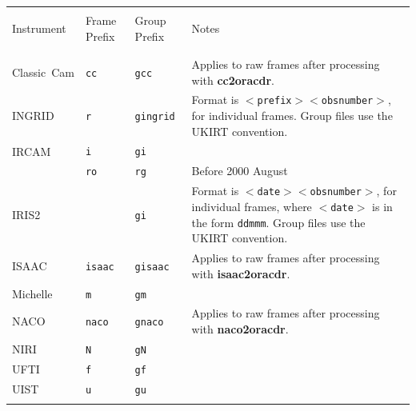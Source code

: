 \documentclass[twoside,11pt]{article}
\renewcommand{\_}{\texttt{\symbol{95}}}
\begin{document}
\begin{center}
\begin{tabular}{lllp{71mm}}
\hline
           &              &               & \\
Instrument~& Frame Prefix & Group Prefix  & Notes \\ 
           &              &               & \\ \hline
           &              &               & \\ \medskip
Classic~Cam& {\tt{cc}}    & {\tt{gcc}}    & Applies to raw frames after
                                            processing with {\bf{cc2oracdr}}. \\
INGRID     & {\tt{r}}     & {\tt{gingrid}}& Format is {\tt$<$prefix$><$obs\_number$>$},
                                            for individual frames.  Group files
                                            use the UKIRT convention. \\
IRCAM      & {\tt{i}}     & {\tt{gi}}     & \\ \medskip
           & {\tt{ro}}    & {\tt{rg}}     & Before 2000 August \\ \medskip
IRIS2      &              & {\tt{gi}}     & Format is {\tt$<$date$><$obs\_number$>$}, 
                                            for individual frames, where {\tt$<$date$>$}
                                            is in the form {\tt{ddmmm}}.   Group files
                                            use the UKIRT convention. \\ \medskip
ISAAC      & {\tt{isaac}} & {\tt{gisaac}} & Applies to raw frames after
                                            processing with {\bf{isaac2oracdr}}. \\ \medskip
Michelle   & {\tt{m}}     & {\tt{gm}}     & \\ \medskip
NACO       & {\tt{naco}}  & {\tt{gnaco}}  & Applies to raw frames after
                                            processing with {\bf{naco2oracdr}}. \\ \medskip
NIRI       & {\tt{N}}     & {\tt{gN}}     & \\ \medskip
UFTI       & {\tt{f}}     & {\tt{gf}}     & \\ \medskip
UIST       & {\tt{u}}     & {\tt{gu}}     & \\
           &              &               & \\ \hline
\end{tabular}
\end{center}
\bigskip
\end{document}
